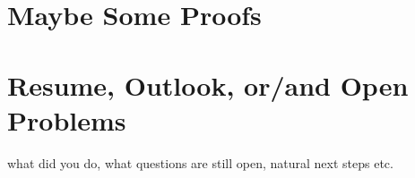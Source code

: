\documentclass[12pt]{amsart}
\numberwithin{equation}{section}
\theoremstyle{definition}
\numberwithin{thm}{section}
\begin{document}


\newpage
\section{Maybe Some Proofs}


\newpage
\section{Resume, Outlook, or/and Open Problems}
\label{Sec:Outlook}


what did you do, what questions are still open, natural next steps etc. 



\newpage


\end{document}
